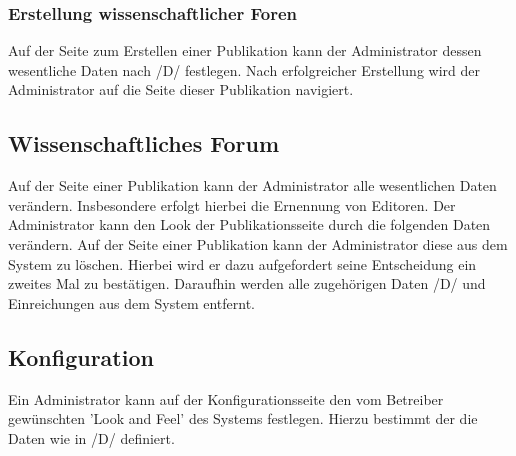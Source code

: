 \subsubsection{Erstellung wissenschaftlicher Foren}
\begin{description}
    \XXitem{} Auf der Seite zum Erstellen einer Publikation kann der Administrator dessen
    wesentliche Daten nach /D/ %
    festlegen. Nach erfolgreicher Erstellung wird der Administrator auf die Seite dieser
    Publikation navigiert.
\end{description}

\subsection{Wissenschaftliches Forum}
\begin{description}
    \XXitem{} Auf der Seite einer Publikation kann der Administrator alle wesentlichen Daten
    verändern. Insbesondere erfolgt hierbei die Ernennung von Editoren.
     Der Administrator kann den Look der Publikationsseite durch die folgenden Daten
    verändern. %
    \XXitem{} Auf der Seite einer Publikation kann der Administrator diese aus dem System zu löschen.
    Hierbei wird er dazu aufgefordert seine Entscheidung ein zweites Mal zu bestätigen.
    Daraufhin werden alle zugehörigen Daten /D/ und Einreichungen aus dem System entfernt.
\end{description}

\subsection{Konfiguration}
\begin{description}
    \XXitem{} Ein Administrator kann auf der Konfigurationsseite den vom Betreiber gewünschten
    'Look and Feel' des Systems festlegen. Hierzu bestimmt der die Daten wie in /D/ definiert. %
\end{description}


